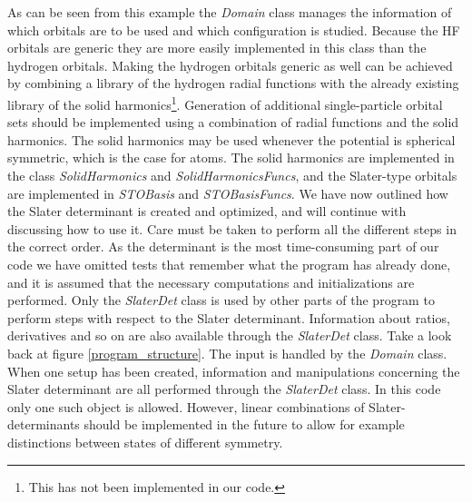 As can be seen from this example the \emph{Domain} class manages the
information of which orbitals are to be used and which configuration is
studied. Because the HF orbitals are generic they are more easily
implemented in this class than the hydrogen orbitals. Making the
hydrogen orbitals generic as well can be achieved by combining
a library of the hydrogen radial functions with the already existing
library of the solid harmonics\footnote{This has not been implemented
  in our code.}.
\newline
%
\newline
Generation of additional single-particle orbital sets should be
implemented using a combination of radial functions and the solid
harmonics. The solid harmonics may be used 
whenever the potential is spherical symmetric, which is the case for
atoms. The solid harmonics are implemented in the class
\emph{SolidHarmonics} and \emph{SolidHarmonicsFuncs}, and the
Slater-type orbitals are implemented in \emph{STOBasis} and
\emph{STOBasisFuncs}.
\newline
%
\newline
We have now outlined how the Slater determinant is created and
optimized, and will continue with discussing how to use it. Care must
be taken to perform all the different steps 
in the correct order. As the determinant is the most time-consuming
part of our code we have omitted tests that remember what the program
has already done, and it is assumed that the necessary computations
and initializations are performed.
\newline
%
\newline
Only the \emph{SlaterDet} class is used by other parts of the program
to perform steps with respect to the Slater determinant. Information
about ratios, derivatives and so on are also available through the
\emph{SlaterDet} class.  
Take a look back at figure \ref{program_structure}. The input is
handled by the \emph{Domain} class. When one setup has been created,
information and manipulations concerning the Slater determinant are
all performed through the \emph{SlaterDet} class. 
In this code only one such object is allowed. However,
linear combinations of Slater-determinants should be implemented in
the future to allow for example distinctions between states of
different symmetry.
\newline

